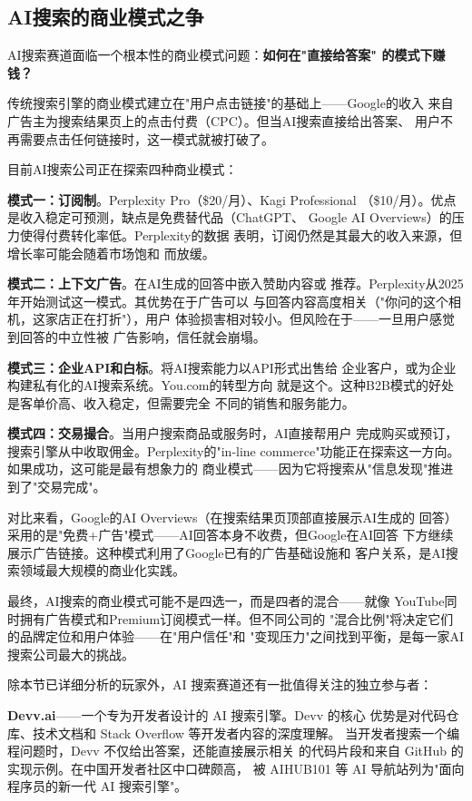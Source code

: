 \subsection{AI搜索的商业模式之争}
\label{subsec:search-business-model}

AI搜索赛道面临一个根本性的商业模式问题：\textbf{如何在"直接给答案"
的模式下赚钱？}

传统搜索引擎的商业模式建立在"用户点击链接"的基础上——Google的收入
来自广告主为搜索结果页上的点击付费（CPC）。但当AI搜索直接给出答案、
用户不再需要点击任何链接时，这一模式就被打破了。

目前AI搜索公司正在探索四种商业模式：

\textbf{模式一：订阅制}。Perplexity Pro（\$20/月）、Kagi Professional
（\$10/月）。优点是收入稳定可预测，缺点是免费替代品（ChatGPT、
Google AI Overviews）的压力使得付费转化率低。Perplexity的数据
表明，订阅仍然是其最大的收入来源，但增长率可能会随着市场饱和
而放缓。

\textbf{模式二：上下文广告}。在AI生成的回答中嵌入赞助内容或
推荐。Perplexity从2025年开始测试这一模式。其优势在于广告可以
与回答内容高度相关（"你问的这个相机，这家店正在打折"），用户
体验损害相对较小。但风险在于——一旦用户感觉到回答的中立性被
广告影响，信任就会崩塌。

\textbf{模式三：企业API和白标}。将AI搜索能力以API形式出售给
企业客户，或为企业构建私有化的AI搜索系统。You.com的转型方向
就是这个。这种B2B模式的好处是客单价高、收入稳定，但需要完全
不同的销售和服务能力。

\textbf{模式四：交易撮合}。当用户搜索商品或服务时，AI直接帮用户
完成购买或预订，搜索引擎从中收取佣金。Perplexity的"in-line
commerce"功能正在探索这一方向。如果成功，这可能是最有想象力的
商业模式——因为它将搜索从"信息发现"推进到了"交易完成"。

对比来看，Google的AI Overviews（在搜索结果页顶部直接展示AI生成的
回答）采用的是"免费+广告"模式——AI回答本身不收费，但Google在AI回答
下方继续展示广告链接。这种模式利用了Google已有的广告基础设施和
客户关系，是AI搜索领域最大规模的商业化实践。

最终，AI搜索的商业模式可能不是四选一，而是四者的混合——就像
YouTube同时拥有广告模式和Premium订阅模式一样。但不同公司的
"混合比例"将决定它们的品牌定位和用户体验——在"用户信任"和
"变现压力"之间找到平衡，是每一家AI搜索公司最大的挑战。

除本节已详细分析的玩家外，AI 搜索赛道还有一批值得关注的独立参与者：

\textbf{Devv.ai}——一个专为开发者设计的 AI 搜索引擎。Devv 的核心
优势是对代码仓库、技术文档和 Stack Overflow 等开发者内容的深度理解。
当开发者搜索一个编程问题时，Devv 不仅给出答案，还能直接展示相关
的代码片段和来自 GitHub 的实现示例。在中国开发者社区中口碑颇高，
被 AIHUB101 等 AI 导航站列为"面向程序员的新一代 AI 搜索引擎"。

